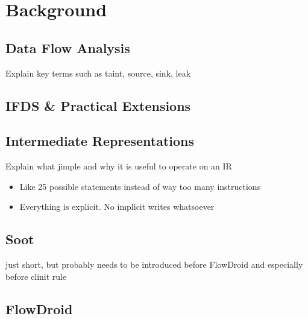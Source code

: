 \documentclass[../draft.tex]{subfiles}
\begin{document}
    \chapter{Background}
    \section{Data Flow Analysis}
    Explain key terms such as taint, source, sink, leak
    
    \section{IFDS \& Practical Extensions}
    
    
    \section{Intermediate Representations}
    Explain what jimple and why it is useful to operate on an IR
    \begin{itemize}
        \item Like 25 possible statements instead of way too many instructions
        \item Everything is explicit. No implicit writes whatsoever
    \end{itemize}
    
    \section{Soot}
    just short, but probably needs to be introduced before FlowDroid and especially before clinit rule
    \section{FlowDroid}    
\end{document}
